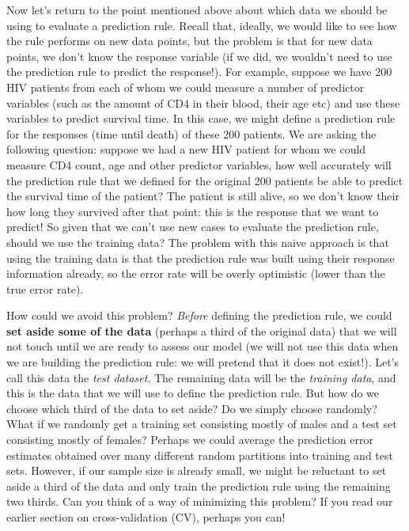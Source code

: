Now let's return to the point mentioned above about which data we should be using to evaluate a prediction rule. Recall that, ideally, we would like to see how the rule performs on new data points, but the problem is that for new data points, we don't know the response variable (if we did, we wouldn't need to use the prediction rule to predict the response!). For example, suppose we have 200 HIV patients from each of whom we could measure a number of predictor variables (such as the amount of CD4 in their blood, their age etc) and use these variables to predict survival time. In this case, we might define a prediction rule for the responses (time until death) of these 200 patients. We are asking the following question: suppose we had a new HIV patient for whom we could measure CD4 count, age and other predictor variables, how well accurately will the prediction rule that we defined for the original 200 patients be able to predict the survival time of the patient? The patient is still alive, so we don't know their how long they survived after that point: this is the response that we want to predict! So given that we can't use new cases to evaluate the prediction rule, should we use the training data? The problem with this naive approach is that using the training data is that the prediction rule was built using their response information already, so the error rate will be overly optimistic (lower than the true error rate). 

How could we avoid this problem? \textit{Before} defining the prediction rule, we could \textbf{set aside some of the data} (perhaps a third of the original data) that we will not touch until we are ready to assess our model (we will not use this data when we are building the prediction rule: we will pretend that it does not exist!). Let's call this data the \textit{test dataset}. The remaining data will be the \textit{training data}, and this is the data that we will use to define the prediction rule. But how do we choose which third of the data to set aside? Do we simply choose randomly? What if we randomly get a training set consisting mostly of males and a test set consisting mostly of females? Perhaps we could average the prediction error estimates obtained over many different random partitions into training and test sets. However, if our sample size is already small, we might be reluctant to set aside a third of the data and only train the prediction rule using the remaining two thirds. Can you think of a way of minimizing this problem? If you read our earlier section on cross-validation (CV), perhaps you can! 

